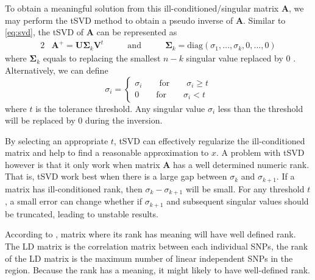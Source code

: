 			To obtain a meaningful solution from this ill-conditioned/singular matrix $\boldsymbol{A}$, we may perform the \gls{tSVD} method to obtain a pseudo inverse of $\boldsymbol{A}$.
			Similar to \cref{eq:svd}, the \gls{tSVD} of $\boldsymbol{A}$ can be represented as 
			\begin{alignat}{2}
				&\boldsymbol{A}^+ = \boldsymbol{U\Sigma}_k\boldsymbol{V}^t  &\qquad\text{and}\qquad  &\boldsymbol{\Sigma}_k=\mathrm{diag}(\sigma_1,\dots,\sigma_k,0,\dots,0)
				\label{eq:tsvd}				
			\end{alignat}
			where $\boldsymbol{\Sigma}_k$ equals to replacing the smallest $n-k$ singular value replaced by 0 \citep{Hansen1987}. 
			Alternatively, we can define
			\begin{equation}
			\sigma_i=\begin{cases}
			\sigma_i\qquad\text{for}\qquad\sigma_i\ge t\\
			0\qquad\text{for}\qquad\sigma_i<t
			\end{cases}
			\end{equation}
			where $t$ is the tolerance threshold. 
			Any singular value $\sigma_i$ less than the threshold will be replaced by 0 during the inversion.
			
			By selecting an appropriate $t$, \gls{tSVD} can effectively regularize the ill-conditioned matrix and help to find a reasonable approximation to $x$. 
			A problem with \gls{tSVD} however is that it only work when matrix $\boldsymbol{A}$ has a well determined numeric rank\citep{Hansen1987}.
			That is, \gls{tSVD} work best when there is a large gap between $\sigma_k$ and $\sigma_{k+1}$.
			If a matrix has ill-conditioned rank, then $\sigma_k-\sigma_{k+1}$ will be small.
			For any threshold $t$, a small error can change whether if $\sigma_{k+1}$ and subsequent singular values should be truncated, leading to unstable results. 
			
			According to \citet{Hansen1987}, matrix where its rank has meaning will have well defined rank. 
			The \gls{LD} matrix is the correlation matrix between each individual \glspl{SNP}, the rank of the \gls{LD} matrix is the maximum number of linear independent \glspl{SNP} in the region.
			Because the rank has a meaning, it might likely to have well-defined rank.
			 
